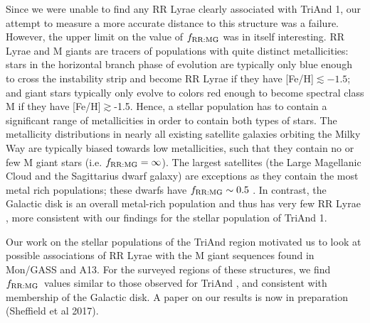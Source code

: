 \documentclass[galaxies,article,submit,moreauthors,pdftex,10pt,a4paper]{mdpi}
\newcommand{\frrmg}{\ensuremath{f_{\rm RR:MG}}}
\begin{document}

Since we were unable to find any RR Lyrae clearly associated with TriAnd 1, our attempt to measure a more accurate distance to this structure was a failure.
However, the upper limit on the value of $\frrmg$ was in itself interesting.
RR Lyrae and M giants are tracers of populations with quite distinct metallicities: stars in the horizontal branch phase of evolution are typically only blue enough to cross the instability strip and become RR Lyrae if they have [Fe/H]$\lesssim -1.5$; and giant stars typically only evolve to colors red enough to become spectral class M if they have [Fe/H]$\gtrsim$-1.5.
Hence, a stellar population has to contain a significant range of metallicities in order to contain both types of stars.
The metallicity distributions in nearly all existing satellite galaxies
orbiting the Milky Way \cite[e.g.,][]{kirby11} are typically biased towards
low metallicities, such that they contain no or few M giant stars (i.e. $\frrmg = \infty$).
The largest satellites (the Large Magellanic Cloud and the Sagittarius dwarf galaxy) are exceptions as they contain the most metal rich populations; these dwarfs have $\frrmg \sim 0.5$ \cite{pricewhelan15}.
In contrast, the Galactic disk is an overall metal-rich population and thus has very few RR Lyrae \cite[i.e. $f_{\rm RR:M} \sim 0$][]{amrose01}, more consistent with our findings for the stellar population of TriAnd 1.

Our work on the stellar populations of the TriAnd region motivated us to look at possible associations of RR Lyrae with the M giant sequences found in Mon/GASS and A13.
For the surveyed regions of these structures, we find \frrmg\ values similar to those observed for TriAnd , and consistent with membership of the Galactic disk. A paper on our results is now in preparation (Sheffield et al 2017).
\end{document}

